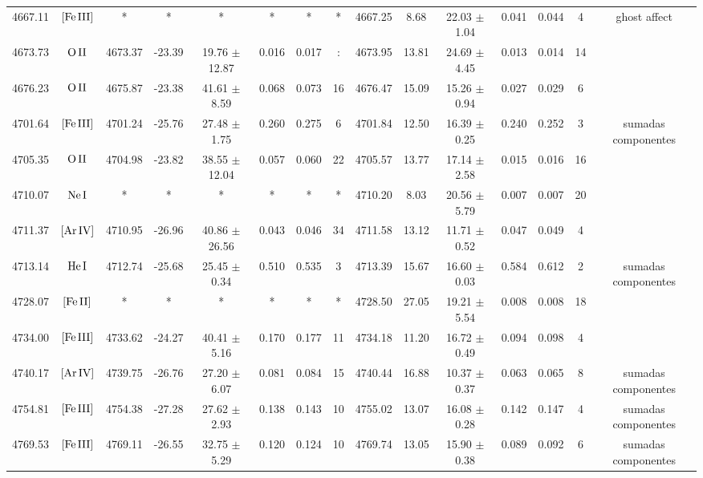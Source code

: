 \documentclass{article}
\begin{document}
\begin{table*}
\begin{adjustbox}{width=\textwidth}
\begin{tabular}{ccccccccccccccc}
4667.11 & $\mbox{[Fe}\thinspace \mbox{III]}$ & * & * & * & * & * & * & 4667.25 & 8.68 & 22.03 $\pm$ 1.04 & 0.041 & 0.044 & 4 &  ghost affect \\
4673.73 & $\mbox{O}\thinspace \mbox{II}$ & 4673.37 & -23.39 & 19.76 $\pm$ 12.87 & 0.016 & 0.017 & : & 4673.95 & 13.81 & 24.69 $\pm$ 4.45 & 0.013 & 0.014 & 14 &  \\
4676.23 & $\mbox{O}\thinspace \mbox{II}$ & 4675.87 & -23.38 & 41.61 $\pm$ 8.59 & 0.068 & 0.073 & 16 & 4676.47 & 15.09 & 15.26 $\pm$ 0.94 & 0.027 & 0.029 & 6 &  \\
4701.64 & $\mbox{[Fe}\thinspace \mbox{III]}$ & 4701.24 & -25.76 & 27.48 $\pm$ 1.75 & 0.260 & 0.275 & 6 & 4701.84 & 12.50 & 16.39 $\pm$ 0.25 & 0.240 & 0.252 & 3 &  sumadas componentes \\
4705.35 & $\mbox{O}\thinspace \mbox{II}$ & 4704.98 & -23.82 & 38.55 $\pm$ 12.04 & 0.057 & 0.060 & 22 & 4705.57 & 13.77 & 17.14 $\pm$ 2.58 & 0.015 & 0.016 & 16 &  \\
4710.07 & $\mbox{Ne}\thinspace \mbox{I}$ & * & * & * & * & * & * & 4710.20 & 8.03 & 20.56 $\pm$ 5.79 & 0.007 & 0.007 & 20 &  \\
4711.37 & $\mbox{[Ar}\thinspace \mbox{IV]}$ & 4710.95 & -26.96 & 40.86 $\pm$ 26.56 & 0.043 & 0.046 & 34 & 4711.58 & 13.12 & 11.71 $\pm$ 0.52 & 0.047 & 0.049 & 4 &  \\
4713.14 & $\mbox{He}\thinspace \mbox{I}$ & 4712.74 & -25.68 & 25.45 $\pm$ 0.34 & 0.510 & 0.535 & 3 & 4713.39 & 15.67 & 16.60 $\pm$ 0.03 & 0.584 & 0.612 & 2 &  sumadas componentes \\
4728.07 & $\mbox{[Fe}\thinspace \mbox{II]}$ & * & * & * & * & * & * & 4728.50 & 27.05 & 19.21 $\pm$ 5.54 & 0.008 & 0.008 & 18 &  \\
4734.00 & $\mbox{[Fe}\thinspace \mbox{III]}$ & 4733.62 & -24.27 & 40.41 $\pm$ 5.16 & 0.170 & 0.177 & 11 & 4734.18 & 11.20 & 16.72 $\pm$ 0.49 & 0.094 & 0.098 & 4 &  \\
4740.17 & $\mbox{[Ar}\thinspace \mbox{IV]}$ & 4739.75 & -26.76 & 27.20 $\pm$ 6.07 & 0.081 & 0.084 & 15 & 4740.44 & 16.88 & 10.37 $\pm$ 0.37 & 0.063 & 0.065 & 8 &  sumadas componentes \\
4754.81 & $\mbox{[Fe}\thinspace \mbox{III]}$ & 4754.38 & -27.28 & 27.62 $\pm$ 2.93 & 0.138 & 0.143 & 10 & 4755.02 & 13.07 & 16.08 $\pm$ 0.28 & 0.142 & 0.147 & 4 &  sumadas componentes \\
4769.53 & $\mbox{[Fe}\thinspace \mbox{III]}$ & 4769.11 & -26.55 & 32.75 $\pm$ 5.29 & 0.120 & 0.124 & 10 & 4769.74 & 13.05 & 15.90 $\pm$ 0.38 & 0.089 & 0.092 & 6 &  sumadas componentes \\

\end{tabular}
\end{adjustbox}
\end{table*}
\end{document}
